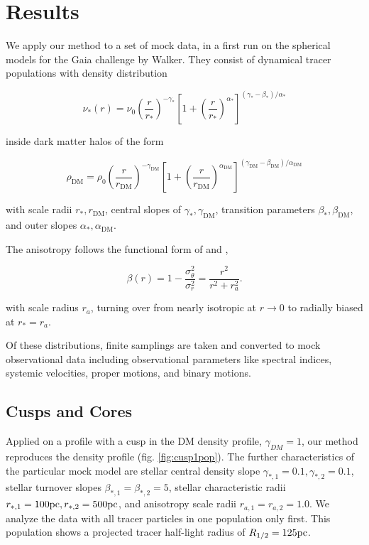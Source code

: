 \section{Results}\label{sec:results}

We apply our method to a set of mock data, in a first run on the
spherical models for the Gaia challenge by Walker. They consist of
dynamical tracer populations with density distribution

\begin{equation}
    \nu_*(r) = \nu_0\left(\frac{r}{r_*}\right)^{-\gamma_*} \left[1+\left(\frac{r}{r_*}\right)^{\alpha_*}\right]^{(\gamma_*-\beta_*)/\alpha_*}
\end{equation}

inside dark matter halos of the form

\begin{equation}
    \rho_{\text{DM}} = \rho_0\left(\frac{r}{r_{\text{DM}}}\right)^{-\gamma_{\text{DM}}}\left[1+\left(\frac{r}{r_{\text{DM}}}\right)^{\alpha_{\text{DM}}}\right]^{(\gamma_{\text{DM}}-\beta_{\text{DM}})/\alpha_{\text{DM}}}
\end{equation}

with scale radii $r_*, r_\text{DM}$, central slopes of $\gamma_*,
\gamma_{\text{DM}}$, transition parameters
$\beta_*,\beta_{\text{DM}}$, and outer slopes $\alpha_*,
\alpha_{\text{DM}}$.

The anisotropy follows the functional form of \citet{Osipkov1979} and
\citet{Merritt1985},

\begin{equation}
    \beta(r)=1-\frac{\sigma_\theta^2}{\sigma_r^2} = \frac{r^2}{r^2+r_a^2}.
\end{equation}

with scale radius $r_a$, turning over from nearly isotropic at $r\to
0$ to radially biased at $r_*=r_a$.

Of these distributions, finite samplings are taken and converted to
mock observational data including observational parameters like
spectral indices, systemic velocities, proper motions, and binary
motions.

\subsection{Cusps and Cores}

Applied on a profile with a cusp in the DM density profile,
$\gamma_{DM}=1$, our method reproduces the density profile
(fig. \ref{fig:cusp1pop}). The further characteristics of the particular
mock model are stellar central density slope $\gamma_{*,1}=0.1,
\gamma_{*,2}=0.1$, stellar turnover slopes
$\beta_{*,1}=\beta_{*,2}=5$, stellar characteristic radii
$r_{*,1}=100\mathrm{pc}, r_{*,2}=500\mathrm{pc}$, and anisotropy scale radii
$r_{a,1}=r_{a,2}=1.0$. We analyze the data with all tracer particles
in one population only first. This population shows a projected tracer
half-light radius of $R_{1/2}=125\mathrm{pc}$.

